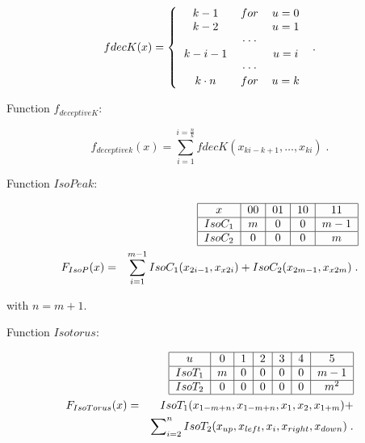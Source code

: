 \documentclass[runningheads]{llncs}
\begin{document}
\begin{equation} 
fdecK(x)=\left\{  
\begin{tabular}{ccc} 
$k-1$ & $for$ & $u=0$ \\  
$k-2$ &       & $u=1$ \\  
      & $\cdot \cdot \cdot $ &  \\  
$k-i-1$ &  & $u=i$ \\  
& $\cdot \cdot \cdot $ &  \\  
$k\cdot n$ & $for$ & $u=k$ \\ 
\end{tabular} 
\right. \; .   \label{GDECK} 
\end{equation}
 
Function $f_{deceptiveK}$: 

\begin{equation}  
 f_{deceptivek}(x)=\sum\limits_{i=1}^{i=\frac{n}{k} }fdecK(x_{ki-k+1},\ldots,x_{ki}) \; . 
 \label{FDECK}
\end{equation} 


Function $IsoPeak$: 
 
\begin{eqnarray}
&&
\begin{tabular}{|c|c|c|c|c|} 
\hline 
$x$ & $00$ & $01$ & $10$ & $11$  \\ \hline 
$IsoC_1$ & $m$ & $0$ & $0$ & $m-1$  \\ \hline 
$IsoC_2$ & $0$ & $0$ & $0$ & $m$  \\ \hline 
\end{tabular} 
\label{ISOPEAK} \\
  F_{IsoP}(x) &=& \sum_{i=1}^{m-1} IsoC_1(x_{2i-1},x_{x2i}) +
  IsoC_2(x_{2m-1},x_{x2m}) \;. 
\nonumber 
\end{eqnarray} 
 
with $n=m+1$.   



Function $Isotorus$: 
 
\begin{eqnarray} 
&&  
\begin{tabular}{|c|c|c|c|c|c|c|} 
\hline 
$u$ & $0$ & $1$ & $2$ & $3$ & $4$ & $5$ \\ \hline 
$IsoT_1$ & $m$ & $0$ & $0$ & $0$ & $0$ & $m-1$ \\ \hline 
$IsoT_2$ & $0$ & $0$ & $0$ & $0$ & $0$ & $m^2$ \\ \hline 
\end{tabular} 
\label{ISOTORUS} \\ 
F_{IsoTorus}(x) &=&IsoT_1(x_{1-m+n},x_{1-m+n},x_1,x_2,x_{1+m})+  \nonumber \\ 
&&\sum\nolimits_{i=2}^nIsoT_2(x_{up},x_{left},x_i,x_{right},x_{down})  \;. 
\nonumber 
\end{eqnarray} 
 
\end{document}
